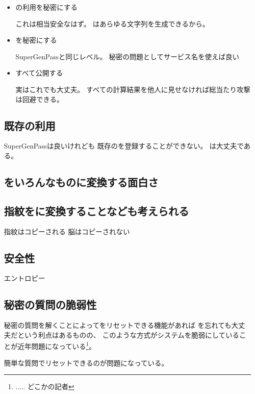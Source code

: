 \documentclass[twoside]{wiss}
\begin{document}
\begin{itemize}
\item {\EP}の利用を秘密にする

これは相当安全なはず。
{\EP}はあらゆる文字列を生成できるから。

\item {\SS}を秘密にする

SuperGenPassと同じレベル。
秘密の問題としてサービス名を使えば良い

\item すべて公開する

実はこれでも大丈夫。
すべての計算結果を他人に見せなければ総当たり攻撃は回避できる。

\end{itemize}

\subsection{既存{\PW}の利用}

SuperGenPass\cite{SuperGenPass}は良いけれども
既存の{\PW}を登録することができない。
{\EP}は大丈夫である。

\subsection{{\EM}をいろんなものに変換する面白さ}

\subsection{指紋を{\PW}に変換することなども考えられる}

指紋はコピーされる
脳はコピーされない

\subsection{安全性}

エントロピー

\subsection{秘密の質問の脆弱性}

秘密の質問を解くことによって{\PW}をリセットできる機能があれば
{\PW}を忘れても大丈夫だという利点はあるものの、
このような方式がシステムを脆弱にしていることが近年問題になっている\footnote{
  ..... どこかの記者
}。

簡単な質問でリセットできるのが問題になっている。
\end{document}
